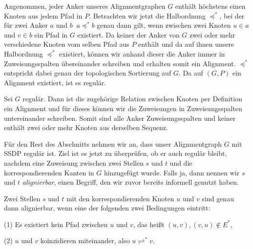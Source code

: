 \begin{beweis}
	\bewhin Angenommen, jeder Anker unseres Alignmentgraphen $G$ enthält höchstens einen Knoten aus jedem Pfad in $P$. Betrachten wir jetzt die Halbordnung $\preceq^{*}$, bei der für zwei Anker $a$ und $b$ $\:a \preceq^{*} b$ genau dann gilt, wenn zwischen zwei Knoten $u \in a$ und $v \in b$ ein Pfad in $G$ existiert. Da keiner der Anker von $G$ zwei oder mehr verschiedene Knoten vom selben Pfad aus $P$ enthält und da auf ihnen unsere Halbordnung $\preceq^{*}$ existiert, können wir anhand dieser die Anker immer in Zuweisungsspalten übereinander schreiben und erhalten somit ein Alignment. $\preceq^{*}$ entspricht dabei genau der topologischen Sortierung auf $G$. Da auf $(G,P)$ ein Alignment existiert, ist es regulär.
	
	\bewrueck Sei $G$ regulär. Dann ist die zugehörige Relation zwischen Knoten per Definition ein Alignment und für dieses können wir die Zuweisungen in Zuweisungsspalten untereinander schreiben. Somit sind alle Anker Zuweisungsspalten und keiner enthält zwei oder mehr Knoten aus derselben Sequenz.
\end{beweis}

Für den Rest des Abschnitts nehmen wir an, dass unser Alignmentgraph $G$ mit SSDP regulär ist. Ziel ist es jetzt zu überprüfen, ob er auch regulär bleibt, nachdem eine Zuweisung zwischen zwei Stellen $s$ und $t$ und die korrespondierenden Kanten in $G$ hinzugefügt wurde. Falls ja, dann nennen wir $s$ und $t$ \emph{alignierbar}, einen Begriff, den wir zuvor bereits informell genutzt haben.

\begin{lemma}[{\cite{a97}}]
	Zwei Stellen $s$ und $t$ mit den korrespondierenden Knoten $u$ und $v$ sind genau dann alignierbar, wenn eine der folgenden zwei Bedingungen eintritt:
	
	(1) Es existiert kein Pfad zwischen $u$ und $v$, das heißt $(u,v),(v,u) \notin E^{*}$,
	
	(2) $u$ und $v$ koinzidieren miteinander, also $u \rightleftharpoons^{*} v$.
\end{lemma}

